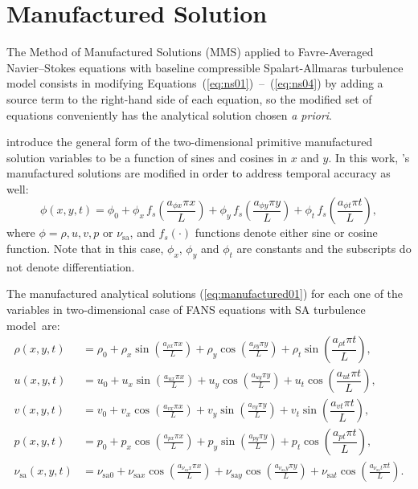 \documentclass[10pt]{article}
\newcommand{\sa}{\nu_{\mathrm{sa}}}
\newcommand{\tsa}{\mathrm{sa}}
\begin{document}
\section{Manufactured Solution}

The Method of Manufactured Solutions (MMS) applied to Favre-Averaged Navier--Stokes equations with baseline compressible Spalart-Allmaras turbulence model consists in modifying Equations~(\ref{eq:ns01})~--~(\ref{eq:ns04}) by adding a source term to the right-hand side of each equation, so the modified set of equations conveniently has the analytical solution chosen \textit{a priori}.

\citet{Roy2002} introduce the general form of the two-dimensional primitive manufactured solution variables to be  a function of sines and cosines in $x$ and $y$. In this work, \citet{Roy2002}'s manufactured solutions are modified in order to address temporal accuracy as well:
\begin{equation}
 \label{eq:manufactured01}
  \phi (x,y,t) = \phi_0+ \phi_x\, f_s \left(\frac{a_{\phi x} \pi x}{L} \right) +  \phi_y \,f_s\left(\frac{a_{\phi y} \pi y}{L}\right) + \phi_t \,f_s\left(\frac{a_{\phi t} \pi t}{L}\right),
\end{equation}
where $\phi=\rho,u,v,p$ or $\sa$, and $f_s(\cdot)$ functions denote either sine or cosine function. Note that in this case, $\phi_x$, $\phi_y$  and $\phi_t$ are constants  and the subscripts do not denote differentiation.

The manufactured analytical solutions (\ref{eq:manufactured01}) for each one of the variables in two-dimensional case of FANS equations with SA turbulence model~are:
 \begin{equation}
 \begin{split}
\label{eq:manufactured_2d}
\rho\left(x,y,t\right) &=  \rho_{0}+ \rho_{x} \sin\left(\frac{a_{ \rho x} \pi x}{L}\right)+ \rho_{y} \cos\left(\frac{a_{ \rho y} \pi y}{L}\right)+ \rho_t \sin\left(\dfrac{a_{\rho t} \pi t}{L}\right),\\
u\left(x,y,t\right) &= u_{0}+u_{x} \sin\left(\frac{a_{u x} \pi x}{L}\right)+u_{y} \cos\left(\frac{a_{u y} \pi y}{L}\right) + u_t \cos\left(\dfrac{a_{u t} \pi t}{L}\right),\\
v\left(x,y,t\right) &= v_{0}+v_{x} \cos\left(\frac{a_{v x} \pi x}{L}\right)+v_{y} \sin\left(\frac{a_{v y} \pi y}{L}\right)+ v_t \sin\left(\dfrac{a_{v t} \pi t}{L}\right),\\
p\left(x,y,t\right) &= p_{0}+p_{x} \cos\left(\frac{a_{p x} \pi x}{L}\right)+p_{y} \sin\left(\frac{a_{p y} \pi y}{L}\right)+ p_t \cos\left(\dfrac{a_{p t} \pi t}{L}\right),\\
\sa(x,y,t) &= \nu_{\tsa 0} +\nu_{\tsa x} \cos\left(\frac{a_{\sa x} \pi x}{L}\right) + \nu_{\tsa y} \cos\left(\frac{a_{\sa y} \pi y}{L}\right) + \nu_{\tsa t}\cos\left(\frac{a_{\sa t} \pi t}{L}\right).
\end{split}
\end{equation}
\end{document}
